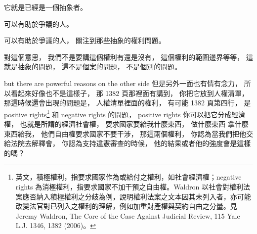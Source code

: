 \hypertarget{w06:cue:2545}{}它就是已經是一個抽象者。

\hypertarget{w06:cue:2546}{}可以有助於爭議的人。

\hypertarget{w06:cue:2547}{}可以有助於爭議的人，
\hypertarget{w06:cue:2548}{}關注到那些抽象的權利問題。

\hypertarget{w06:cue:2549}{}對這個意思，
\hypertarget{w06:cue:2550}{}我們不是要講這個權利有還是沒有，
\hypertarget{w06:cue:2551}{}這個權利的範圍邊界等等，
\hypertarget{w06:cue:2552}{}這就是抽象的問題，
\hypertarget{w06:cue:2553}{}這不是個案的問題，
\hypertarget{w06:cue:2554}{}不是個別的問題。

\hypertarget{w06:cue:2555}{}but there are powerful reasons on the other side
\hypertarget{w06:cue:2556}{}但是另外一面也有情有念力，
\hypertarget{w06:cue:2557}{}所以看起來好像也不是這樣子，
\hypertarget{w06:cue:2558}{}那 1382 頁那裡面有講到，
\hypertarget{w06:cue:2559}{}你把它放到人權清單，
\hypertarget{w06:cue:2560}{}那這時候還會出現的問題是，
\hypertarget{w06:cue:2561}{}人權清單裡面的權利，
\hypertarget{w06:cue:2562}{}有可能 1382 頁第四行，
\hypertarget{w06:cue:2563}{}是 positive rights\footnote{英文，積極權利，指要求國家作為或給付之權利，如社會經濟權；negative rights 為消極權利，指要求國家不加干預之自由權。Waldron 以社會對權利法案應否納入積極權利之分歧為例，說明權利法案之文本因其未列入者，亦可能改變法官對已列入之權利的理解，例如加重財產權與契約自由之分量。見 Jeremy Waldron, The Core of the Case Against Judicial Review, 115 Yale L.J. 1346, 1382 (2006)。} 和 negative rights 的問題，
\hypertarget{w06:cue:2564}{}positive rights 你可以把它分成經濟權，
\hypertarget{w06:cue:2565}{}也就是所謂的經濟社會權，
\hypertarget{w06:cue:2566}{}要求國家要給我什麼東西，
\hypertarget{w06:cue:2567}{}做什麼東西 拿什麼東西給我，
\hypertarget{w06:cue:2568}{}他們自由權要求國家不要干涉，
\hypertarget{w06:cue:2569}{}那這兩個權利，
\hypertarget{w06:cue:2570}{}你認為當我們把他交給法院去解釋會，
\hypertarget{w06:cue:2571}{}你認為支持違憲審查的時候，
\hypertarget{w06:cue:2572}{}他的結果或者他的強度會是這樣的嗎？

